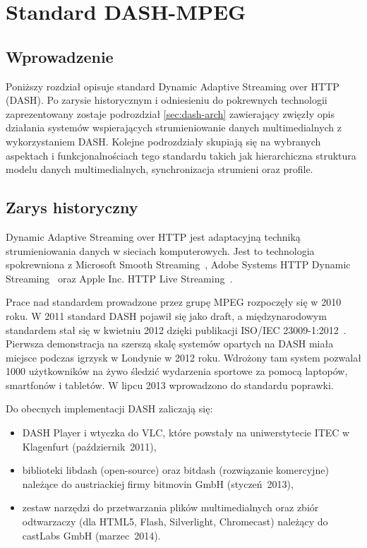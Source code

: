 \chapter{Standard DASH-MPEG}
\label{cha:rozdzial4}

\section{Wprowadzenie}
Poniższy rozdział opisuje standard Dynamic Adaptive Streaming over HTTP (DASH). Po zarysie historycznym i odniesieniu do pokrewnych technologii zaprezentowany zostaje podrozdział \ref{sec:dash-arch} zawierający zwięzły opis działania systemów wspierających strumieniowanie danych multimedialnych z wykorzystaniem DASH. Kolejne podrozdziały skupiają się na wybranych aspektach i funkcjonalnościach tego standardu takich jak hierarchiczna struktura modelu danych multimedialnych, synchronizacja strumieni oraz profile.

\section{Zarys historyczny}
Dynamic Adaptive Streaming over HTTP jest adaptacyjną techniką strumieniowania danych w sieciach komputerowych. Jest to technologia spokrewniona z Microsoft Smooth Streaming~\cite{MicroS}, Adobe Systems HTTP Dynamic Streaming~\cite{ADOBES} oraz Apple Inc. HTTP Live Streaming~\cite{APPLES}.

Prace nad standardem prowadzone przez grupę MPEG rozpoczęły się w 2010 roku. W 2011 standard DASH pojawił się jako draft, a międzynarodowym standardem stał się w kwietniu 2012 dzięki publikacji ISO/IEC 23009-1:2012~\cite{ISO-IEC-DASH}. Pierwsza demonstracja na szerszą skalę systemów opartych na DASH miała miejsce podczas igrzysk w Londynie w 2012 roku. Wdrożony tam system pozwalał 1000 użytkowników na żywo śledzić wydarzenia sportowe za pomocą laptopów, smartfonów i tabletów. W lipcu 2013 wprowadzono do standardu poprawki.

Do obecnych implementacji DASH zaliczają się:
\begin{itemize}
\item DASH Player i wtyczka do VLC, które powstały na uniwerstytecie ITEC w Klagenfurt (październik~2011),
\item biblioteki libdash (open-source) oraz bitdash (rozwiązanie komercyjne) należące do austriackiej firmy bitmovin GmbH (styczeń~2013),
\item zestaw narzędzi do przetwarzania plików multimedialnych oraz zbiór odtwarzaczy (dla HTML5, Flash, Silverlight, Chromecast) należący do castLabs GmbH (marzec~2014).
\end{itemize}

